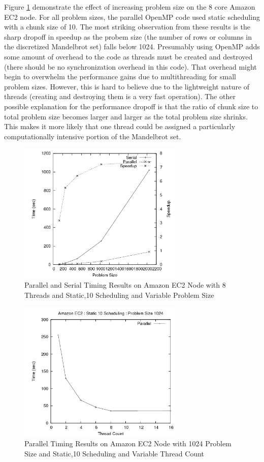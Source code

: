 \documentclass{article}
\begin{document}
Figure \ref{amazon_n} demonstrate the effect of increasing problem size on the 8 core Amazon EC2 node. For all problem sizes, the parallel OpenMP code used static scheduling with a chunk size of 10. The most striking observation from these results is the sharp dropoff in speedup as the probem size (the number of rows or columns in the discretized Mandelbrot set) falls below 1024. Presumably using OpenMP adds some amount of overhead to the code as threads must be created and destroyed (there should be no synchronization overhead in this code). That overhead might begin to overwhelm the performance gains due to multithreading for small problem sizes. However, this is hard to believe due to the lightweight nature of threads (creating and destroying them is a very fast operation). The other possible explanation for the performance dropoff is that the ratio of chunk size to total problem size becomes larger and larger as the total problem size shrinks. This makes it more likely that one thread could be assigned a particularly computationally intensive portion of the Mandelbrot set.

\begin{figure}
\centering
\includegraphics[width=0.7\textwidth]{../data/amazon_n.png}
\caption{Parallel and Serial Timing Results on Amazon EC2 Node with 8 Threads and Static,10 Scheduling and Variable Problem Size}
\label{amazon_n}
\end{figure}

\begin{figure}
\centering
\includegraphics[width=0.7\textwidth]{../data/amazon_threads.png}
\caption{Parallel Timing Results on Amazon EC2 Node with 1024 Problem Size and Static,10 Scheduling and Variable Thread Count}
\label{amazon_threads}
\end{figure}
\end{document}
